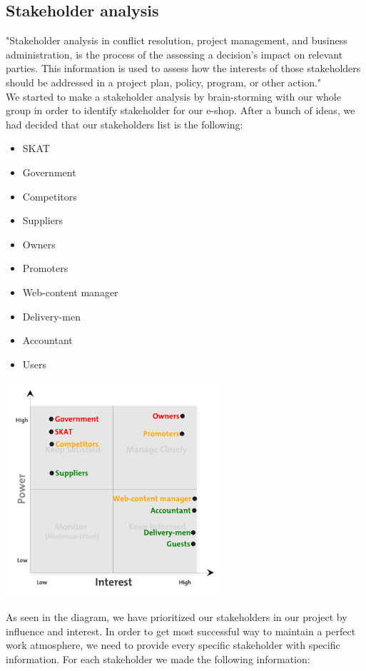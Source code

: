 \documentclass[12p]{article}
\begin{document}
\subsection{Stakeholder analysis} \label{Stakeholder_Analysis}
"Stakeholder analysis in conflict resolution, project management, and business administration, is the process of the assessing a decision's impact on relevant parties. This information is used to assess how the interests of those stakeholders should be addressed in a project plan, policy, program, or other action." \cite{StakeholderAnalysis}
\\
We started to make a stakeholder analysis by brain-storming with our whole group in order to identify stakeholder for our e-shop. After a bunch of ideas, we had decided that our stakeholders list is the following:
\begin{itemize}
\item SKAT
\item Government
\item Competitors
\item Suppliers
\item Owners
\item Promoters
\item Web-content manager
\item Delivery-men
\item Accountant
\item Users
\end{itemize}

\begin{center}
\includegraphics[width=0.6\textwidth]{stakeholder}
\end{center}

As seen in the diagram, we have prioritized our stakeholders in our project by influence and interest. In order to get most successful way to maintain a perfect work atmosphere, we need to provide every specific stakeholder with specific information. For each stakeholder we made the following information: 
\end{document}
